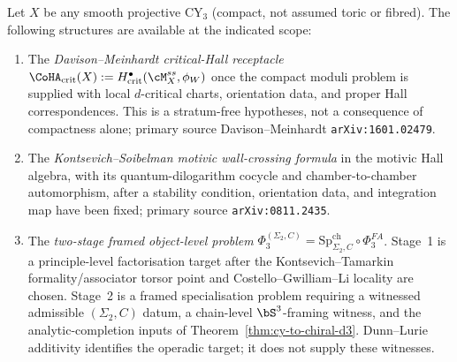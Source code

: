 \begin{proposition}
\label{prop:stratum-free}
Let $X$ be any smooth projective CY$_3$ (compact, not assumed toric or
fibred). The following structures are available at the indicated scope:
\begin{enumerate}[leftmargin=2em]
\item The \emph{Davison--Meinhardt critical-Hall receptacle}
 $\CoHA_{\mathrm{crit}}(X) := H^\bullet_{\mathrm{crit}}(\cM_X^{ss},
 \phi_{W})$ once the compact moduli problem is supplied with local
 $d$-critical charts, orientation data, and proper Hall
 correspondences. This is a stratum-free hypotheses, not a
 consequence of compactness alone; primary source
 Davison--Meinhardt \texttt{arXiv:1601.02479}.
\item The \emph{Kontsevich--Soibelman motivic wall-crossing formula}
 in the motivic Hall algebra, with its quantum-dilogarithm cocycle and
 chamber-to-chamber automorphism, after a stability condition,
 orientation data, and integration map have been fixed; primary source
 \texttt{arXiv:0811.2435}.
\item The \emph{two-stage framed object-level problem}
 $\Phi_3^{(\Sigma_2,C)} =
 \mathrm{Sp}^{\mathrm{ch}}_{\Sigma_2, C} \circ \Phi^{FA}_3$.
 Stage~1 is a principle-level factorisation target after the
 Kontsevich--Tamarkin formality/associator torsor point and
 Costello--Gwilliam--Li locality are chosen. Stage~2 is a framed
 specialisation problem requiring a witnessed admissible
 $(\Sigma_2,C)$ datum, a chain-level $\bS^3$-framing witness, and the
 analytic-completion inputs of Theorem~\ref{thm:cy-to-chiral-d3}.
 Dunn--Lurie additivity identifies the operadic target; it does not
 supply these witnesses.
\end{enumerate}
\end{proposition}

